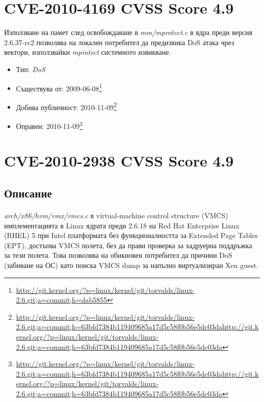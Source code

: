 \documentclass[a4paper,12pt,leqno]{article}
\begin{document}


\section{ CVE-2010-4169 CVSS Score 4.9} %
\label{sec: CVE-2010-4169 CVSS Score 4.9}

Използване на памет след освобождаване в \textit{mm/mprotect.c} в ядра преди версия 2.6.37-rc2 позволява
на локален потребител да предизвика DoS атака чрез вектори, използвайки \textit{mprotect} системното извикване.
\begin{itemize}
    \item Тип: \textit{DoS}
    \item Съществува от: 2009-06-08\footnote{\url{http://git.kernel.org/?p=linux/kernel/git/torvalds/linux-2.6.git;a=commit;h=dab5855}}
    \item Добива публичност: 2010-11-09\footnote{\url{http://git.kernel.org/?p=linux/kernel/git/torvalds/linux-2.6.git;a=commit;h=63bfd7384b119409685a17d5c58f0b56e5dc03dahttp://git.kernel.org/?p=linux/kernel/git/torvalds/linux-2.6.git;a=commit;h=63bfd7384b119409685a17d5c58f0b56e5dc03da}}
    \item Оправен:  2010-11-09\footnote{\url{http://git.kernel.org/?p=linux/kernel/git/torvalds/linux-2.6.git;a=commit;h=63bfd7384b119409685a17d5c58f0b56e5dc03dahttp://git.kernel.org/?p=linux/kernel/git/torvalds/linux-2.6.git;a=commit;h=63bfd7384b119409685a17d5c58f0b56e5dc03da}}
\end{itemize}




\section{CVE-2010-2938 CVSS Score 4.9}
\subsection{Описание}
\paragraph{}
\textit{arch/x86/hvm/vmx/vmcs.c}  в virtual-machine control structure (VMCS) имплементацията в Linux ядрата преди 2.6.18 на Red Hat Enterprise Linux (RHEL) 5 при Intel платформата без функционалността за Extended Page Tables (EPT), достъпва VMCS полета, без да прави проверка за хадруерна поддръжка за тези полета. Това позволява на обикновен потребител да причини DoS (забиване на ОС) като поиска VMCS dump за напълно виртуализиран Xen guest.
\end{document}
